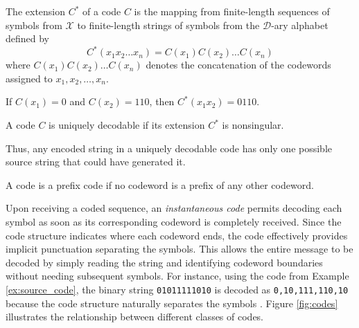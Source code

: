 \begin{definition}\label{def:extension_code}
    The extension $C^*$ of a code $C$ is the mapping from finite-length sequences of symbols from $\mathcal{X}$ to finite-length strings of symbols from the $\mathcal{D}$-ary alphabet defined by
    \begin{equation*}
        C^*(x_1x_2\ldots x_n) = C(x_1)C(x_2)\ldots C(x_n)
    \end{equation*}
    where $C(x_1)C(x_2)\ldots C(x_n)$ denotes the concatenation of the codewords assigned to $x_1, x_2, \ldots, x_n$.
\end{definition}

\begin{example}
    If $C(x_1) = 0$ and $C(x_2) = 110$, then $C^*(x_1x_2) = 0110$.
\end{example}
\begin{definition}\label{def:unique_decodability}
    A code $C$ is uniquely decodable if its extension $C^*$ is nonsingular.
\end{definition}

\noindent Thus, any encoded string in a uniquely decodable code has only one possible source string that could have generated it.

\begin{definition}\label{def:prefix_code}
    A  code is a prefix code if no codeword is a prefix of any other codeword.
\end{definition}

\noindent Upon receiving a coded sequence, an \emph{instantaneous code} permits decoding each symbol as soon as its corresponding codeword is completely received. Since the code structure indicates where each codeword ends, the code effectively provides implicit punctuation separating the symbols. This allows the entire message to be decoded by simply reading the string and identifying codeword boundaries without needing subsequent symbols. For instance, using the code from Example \ref{ex:source_code}, the binary string \texttt{01011111010} is decoded as \texttt{0,10,111,110,10} because the code structure naturally separates the symbols \cite{ElementsofInformationTheory}. Figure \ref{fig:codes} illustrates the relationship between different classes of codes.

